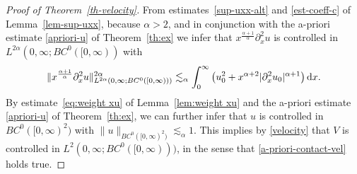 \documentclass[reqno,12pt]{amsart}
\renewcommand{\d}{\ensuremath{\mathrm{d}}}
\renewcommand{\d}{\ensuremath{{\rm d}}}
\numberwithin{equation}{section}
\begin{document}
%
\begin{proof}[Proof of Theorem~\ref{th-velocity}]
From estimates~\eqref{sup-uxx-alt} and \eqref{est-coeff-c} of Lemma~\ref{lem-sup-uxx}, because $\alpha > 2$, and in conjunction with the a-priori estimate \eqref{apriori-u} of Theorem~\ref{th:ex} we infer that $x^{\frac{\alpha+1}{\alpha}} \partial_x^2 u$ is controlled in $L^{2\alpha}(0,\infty;BC^0([0,\infty))$ with
%
\[
\|x^{\frac{\alpha+1}{\alpha}} \partial_x^2 u\|_{L^{2\alpha}(0,\infty;BC^0([0,\infty)))}^{2\alpha} \lesssim_\alpha \int_0^\infty \big(u_0^2 + x^{\alpha+2} |\partial_x^2 u_0|^{\alpha+1}\big) \, \d x.
\]
%
By estimate~\eqref{eq:weight xu} of Lemma~\ref{lem:weight xu} and the a-priori estimate \eqref{apriori-u} of Theorem~\ref{th:ex}, we can further infer that $u$ is controlled in $BC^0([0,\infty)^2)$ with $\|u\|_{BC^0([0,\infty)^2)} \lesssim_\alpha 1$. This implies by \eqref{velocity} that $V$ is controlled in $L^2(0,\infty;BC^0([0,\infty)))$, in the sense that \eqref{a-priori-contact-vel} holds true.
\end{proof}
%


\bigskip

%
\end{document}
